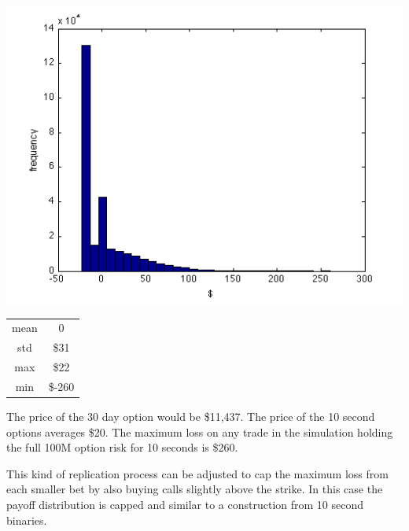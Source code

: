 \documentclass{tran-l}
\theoremstyle{definition}
\theoremstyle{remark}
\numberwithin{equation}{subsection}
\begin{document}
 \begin{center}
\includegraphics[width=6in]{pics/callReplicationHist}%
\label{fig:callReplicationHist}%
\end{center}

\begin{center}
\begin{tabular}{|c|c|}
\hline
mean & 0 \\
std & \$31 \\
max &\$22 \\
min &\$-260 \\
\hline
\end{tabular}
\end{center}

The price of the 30 day option would be \$11,437. The price of the 10 second options averages \$20. The maximum loss on any trade in the simulation holding the full 100M option risk for 10 seconds is \$260.

This kind of replication process can be adjusted to cap the maximum loss from each smaller bet by also buying calls slightly above the strike. In this case the payoff distribution is capped and similar to a construction from 10 second binaries.  
\end{document}
